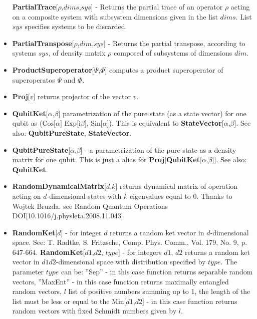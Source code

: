 \documentclass[a4paper,10pt]{scrartcl}
\begin{document}
\begin{itemize}
\textbf{PartialTrace}[$\rho$,$dims$,$sys$] - Returns the partial trace of an operator $\rho$ acting on a composite system with subsystem dimensions given in the list $dims$. List $sys$ specifies systems to be discarded.
\item  \textbf{PartialTranspose}[$\rho$,$dim$,$sys$] - Returns the partial transpose, according to systems $sys$, of density matrix $\rho$ composed of subsystems of dimensions $dim$.
\item  \textbf{ProductSuperoperator}[$\Psi$,$\Phi$] computes a product superoperator of superoperatos $\Psi$ and $\Phi$.
\item  \textbf{Proj}[$v$] returns projector of the vector $v$.
\item  \textbf{QubitKet}[$\alpha$,$\beta$] parametrization of the pure state (as a state vector) for one qubit as ($\text{Cos[$\alpha $] Exp[i$\beta $], Sin[$\alpha $]}$). This is equivalent to \textbf{StateVector}[{$\text{$\alpha $,$\beta $}$}]. See also: \textbf{QubitPureState}, \textbf{StateVector}.
\item  \textbf{QubitPureState}[$\text{$\alpha $,$\beta $}$] - a parametrization of the pure state as a density matrix for one qubit. This is just a alias for \textbf{Proj}[\textbf{QubitKet}[$\text{$\alpha $,$\beta $}$]]. See also: \textbf{QubitKet}.
\item  \textbf{RandomDynamicalMatrix}[$d$,$k$] returns dynamical matrix of operation acting on $d$-dimensional states with $k$ eigenvalues equal to 0. Thanks to Wojtek Bruzda. see Random Quantum Operations DOI[10.1016/j.physleta.2008.11.043].
\item  \textbf{RandomKet}[$d$] - for integer $d$ returns a random ket vector in $d$-dimensional space. See: T. Radtke, S. Fritzsche, Comp. Phys. Comm., Vol. 179, No. 9, p. 647-664. \newline{}
\textbf{RandomKet}[{$d1$,$d2$}, $type$] - for integers $d1$, $d2$ returns a random ket vector in $d1 d2$-dimensional space with distribution specified by $type$. \newline{}
The parameter $type$ can be:\newline{}
\indent{} ''Sep'' - in this case function returns separable random vectors,\newline{}
\indent{} ''MaxEnt'' - in this case function returns maximally entangled random vectors,\newline{}
\indent{} $l$ list of positive numbers summing up to 1, the length of the list must be less or equal to the Min[$d1$,$d2$] - in this case function returns random vectors with fixed Schmidt numbers given by $l$.

\end{itemize}
\end{document}
